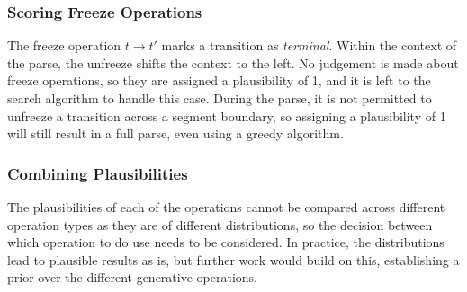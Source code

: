 \documentclass[12pt,a4paper,twoside,openany]{report} \usepackage[pdfborder={0 0 0}]{hyperref}    %
\theoremstyle{definition} \newtheorem{definition}{Definition}[section]
\begin{document}
    \subsubsection{Scoring Freeze Operations} 
    The freeze operation $t \to t'$ marks a transition as \textit{terminal}. Within the context of the parse, the
    unfreeze shifts the context to the left. No judgement is made about freeze operations, so they are assigned
    a plausibility of 1, and it is left to the search algorithm to handle this case. During the parse, it is not
    permitted to unfreeze a transition across a segment boundary, so assigning a plausibility of 1 will still result in
    a full parse, even using a greedy algorithm.

    \subsubsection{Combining Plausibilities} 
    The plausibilities of each of the operations cannot be compared across different operation types as they are of
    different distributions, so the decision between which operation to do use needs to be considered. In practice, the
    distributions lead to plausible results as is, but further work would build on this, establishing a prior
    over the different generative operations.
\end{document}
